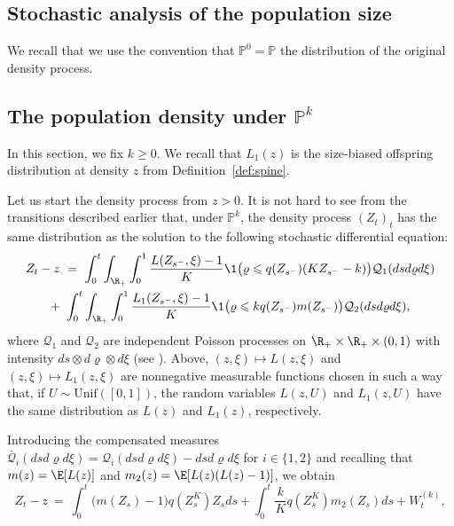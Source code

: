 \begin{refsegment}
\section{Stochastic analysis of the population size}\label{sec:calcul_sto}
We recall that we use the convention that $\mathbb{P}^0=\mathbb{P}$ the distribution of the original density process.

\subsection{The population density under \texorpdfstring{$\mathbb{P}^k$}{Pk}}
In this section, we fix $k\geqslant 0$. We recall that $L_1(z)$ is the size-biased offspring distribution at
density $z$ from Definition~\ref{def:spine}.


Let us start the density process from $z>0$.
It is not hard to see from the transitions described earlier that, under $\mathbb{P}^k$, the density process $(Z_t)_t$ has the same distribution as the solution to the following stochastic differential
equation:
\begin{multline}\label{eq:SDE_under_Q}
    Z_{t}-z\ =\ \int_{0}^{t} \int_{\R_+}\int_0^1 \frac{L(Z_{s^-},\xi)-1}{K}  \1\big(\varrho\leqslant q({Z}_{s^-})(KZ_{s^-}-k)\big)\mathcal{Q}_1(dsd\varrho d\xi)\\
    +\ \int_{0}^{t}\int_{\R_+}\int_0^1  \frac{L_1(Z_{s^-},\xi)-1}{K}  \1\big(\varrho\leqslant k q(Z_{s^-}) m(Z_{s^-})\big)\mathcal{Q}_2(dsd\varrho d\xi),
\end{multline}
where $\mathcal{Q}_1$ and $\mathcal{Q}_2$ are independent Poisson processes on $\R_+\times\R_+\times (0,1)$ with intensity $ds\otimes d\varrho \otimes d\xi$ (see \cite{ikeda_watanabe}). Above, $(z,\xi)\longmapsto L(z,\xi)$ and $(z,\xi)\longmapsto L_1(z,\xi)$ are  nonnegative measurable functions chosen in such a way that, if  $U\sim \mbox{Unif}([0,1])$, the random variables $L(z,U)$ and $L_1(z,U)$ have the same distribution as $L(z)$ and $L_1(z)$, respectively.



 Introducing the compensated measures $ \bar{\mathcal{Q}}_i(dsd\varrho d\xi)= \mathcal{Q}_i(dsd\varrho d\xi)-dsd\varrho d\xi$ for $i\in\{1,2\}$ and recalling that $m(z)=\E[L(z)]$ and $m_2(z)=\E[L(z)(L(z)-1)]$, we obtain
\begin{equation*}
       Z_{t}-z\ =\ \int_0^{t} \big({m}({Z}_s)-1\big)q({Z}^K_s){Z}_s ds + \int_0^{t} \frac{k}{K}  q({Z}^K_s){m}_2({Z}_s) ds + W^{(k)}_t,
\end{equation*}


\end{refsegment}

